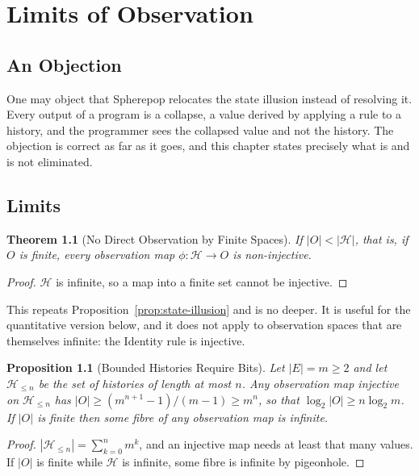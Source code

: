 \documentclass[12pt,oneside,openany]{book}
\theoremstyle{spherepop}
\newtheorem{theorem}[definition]{Theorem}
\newtheorem{proposition}[definition]{Proposition}
\theoremstyle{remarkstyle}
\newcommand{\calH}{\mathcal{H}}
\begin{document}
\chapter{Limits of Observation}
\label{ch:limits}

\section{An Objection}

One may object that Spherepop relocates the state illusion instead of resolving it. Every output of a program is a collapse, a value derived by applying a rule to a history, and the programmer sees the collapsed value and not the history. The objection is correct as far as it goes, and this chapter states precisely what is and is not eliminated.

\section{Limits}

\begin{theorem}[No Direct Observation by Finite Spaces]
\label{thm:no-direct-obs}
If $|O|<|\calH|$, that is, if $O$ is finite, every observation map $\phi:\calH\to O$ is non-injective.
\end{theorem}

\begin{proof}
$\calH$ is infinite, so a map into a finite set cannot be injective.
\end{proof}

This repeats Proposition~\ref{prop:state-illusion} and is no deeper. It is useful for the quantitative version below, and it does not apply to observation spaces that are themselves infinite: the Identity rule is injective.

\begin{proposition}[Bounded Histories Require Bits]
\label{prop:bits}
Let $|E|=m\ge2$ and let $\calH_{\le n}$ be the set of histories of length at most $n$. Any observation map injective on $\calH_{\le n}$ has $|O|\ge(m^{n+1}-1)/(m-1)\ge m^n$, so that $\log_2|O|\ge n\log_2m$. If $|O|$ is finite then some fibre of any observation map is infinite.
\end{proposition}

\begin{proof}
$|\calH_{\le n}|=\sum_{k=0}^nm^k$, and an injective map needs at least that many values. If $|O|$ is finite while $\calH$ is infinite, some fibre is infinite by pigeonhole.
\end{proof}
\end{document}
